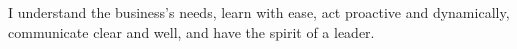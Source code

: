 


\small
I understand the business's needs, learn with ease, act proactive and dynamically, communicate clear and well, and have the spirit of a leader.

